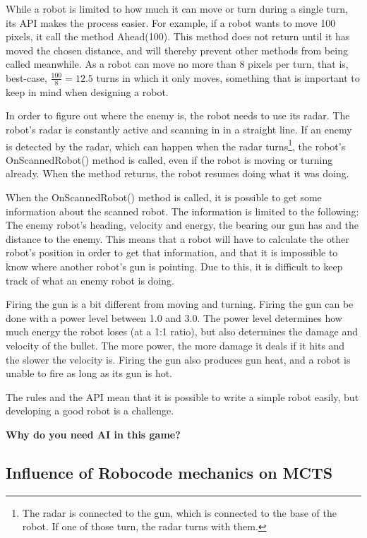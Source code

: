 While a robot is limited to how much it can move or turn during a single turn, its API\cite{robocodeAPI} makes the process easier. For example, if a robot wants to move 100 pixels, it call the method Ahead(100). This method does not return until it has moved the chosen distance, and will thereby prevent other methods from being called meanwhile. As a robot can move no more than 8 pixels per turn, that is, best-case, $\frac{100}{8} = 12.5$ turns in which it only moves, something that is important to keep in mind when designing a robot.

In order to figure out where the enemy is, the robot needs to use its radar. The robot's radar is constantly active and scanning in in a straight line. If an enemy is detected by the radar, which can happen when the radar turns\footnote{The radar is connected to the gun, which is connected to the base of the robot. If one of those turn, the radar turns with them.}, the robot's OnScannedRobot() method is called, even if the robot is moving or turning already. When the method returns, the robot resumes doing what it was doing.

When the OnScannedRobot() method is called, it is possible to get some information about the scanned robot. The information is limited to the following: The enemy robot's heading, velocity and energy, the bearing our gun has and the distance to the enemy. This means that a robot will have to calculate the other robot's position in order to get that information, and that it is impossible to know where another robot's gun is pointing. Due to this, it is difficult to keep track of what an enemy robot is doing.

Firing the gun is a bit different from moving and turning. Firing the gun can be done with a power level between 1.0 and 3.0. The power level determines how much energy the robot loses (at a 1:1 ratio), but also determines the damage and velocity of the bullet. The more power, the more damage it deals if it hits and the slower the velocity is. Firing the gun also produces gun heat, and a robot is unable to fire as long as its gun is hot.

The rules and the API mean that it is possible to write a simple robot easily, but developing a good robot is a challenge.


\textbf{Why do you need AI in this game?}


\subsection{Influence of Robocode mechanics on MCTS}
\label{03_01}

